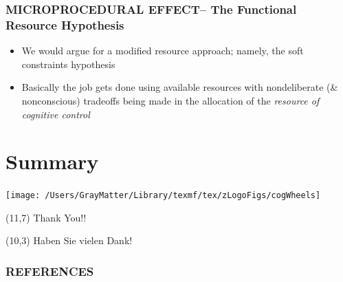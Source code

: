 \documentclass{beamer}
\begin{document}
\begin{frame}
	\frametitle{MICROPROCEDURAL EFFECT-- The Functional Resource Hypothesis}
	\begin{itemize}[<+-| alert@+>]
		\item We would argue for a modified resource approach; namely, the soft constraints hypothesis
		\item Basically the job gets done using available resources with nondeliberate (\& nonconscious) tradeoffs being made in the allocation of the \emph{\textcolor{wdgRed}{resource of cognitive control}}
	\end{itemize}
\end{frame}

\section{Summary}


\begin{frame}
	\texttt{[image: /Users/GrayMatter/Library/texmf/tex/zLogoFigs/cogWheels]}
	\begin{textblock}{4}(11,7)
		\LARGE{\textcolor{wdgRed}{Thank You!!}}
	\end{textblock}
		
	\begin{textblock}{5}(10,3)
		\LARGE{\textcolor{wdgRed}{Haben Sie vielen Dank!}}
	\end{textblock}
\end{frame}

\begin{frame}[allowframebreaks]
	\frametitle{REFERENCES}
	\printbibliography
\end{frame}
\end{document}
